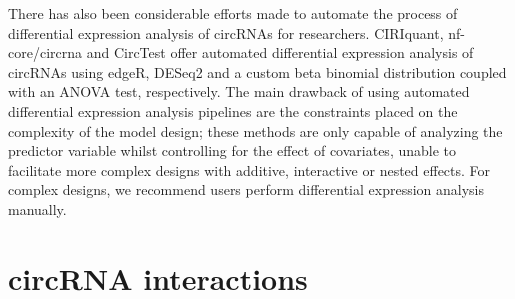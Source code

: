 \documentclass[journal,review,submit,pdftex,moreauthors]{Definitions/mdpi}
\begin{document}
There has also been considerable efforts made to automate the process of differential expression analysis of circRNAs for researchers. CIRIquant, nf-core/circrna and CircTest offer automated differential expression analysis of circRNAs using edgeR, DESeq2 and a custom beta binomial distribution coupled with an ANOVA test, respectively. The main drawback of using automated differential expression analysis pipelines are the constraints placed on the complexity of the model design; these methods are only capable of analyzing the predictor variable whilst controlling for the effect of covariates, unable to facilitate more complex designs with additive, interactive or nested effects. For complex designs, we recommend users perform differential expression analysis manually.

\section{circRNA interactions}
\end{document}

